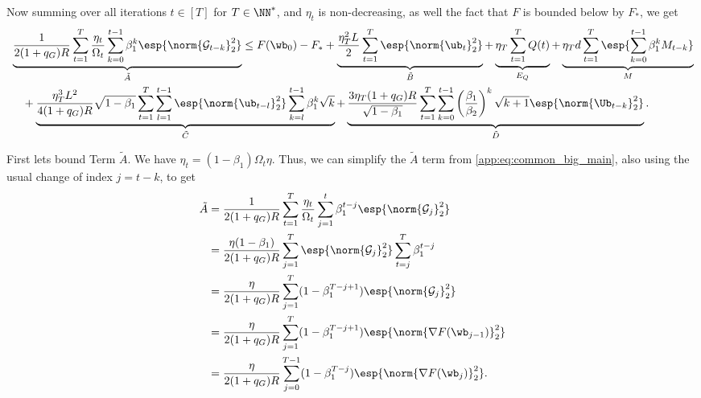 \documentclass[11pt, letterpaper]{article}
\begin{document}
Now summing over all iterations $t \in [T]$ for $T \in \NN^*$, and $\eta_t$ is non-decreasing, as well the fact that $F$ is bounded below by $F_*$, we get
\begin{align}
\nonumber
    &\underbrace{\frac{1}{2 (1+q_G)R} \sum_{t=1}^T \frac{\eta_t}{\Omega_t}\sum_{k=0}^{t-1} \beta_1^k \esp{\norm{\mathcal{G}_{t -k}}_2^2}}_{\tilde{A}} \leq
    F(\wb_0) - F_* + \underbrace{\frac{\eta_T^2 L}{2}\sum_{t=1}^T\esp{\norm{\ub_t}^2_2}}_{\tilde{B}}+\underbrace{\eta_T\sum_{t=1}^TQ(t)}_{E_Q}+ \underbrace{\eta_Td\sum_{t=1}^T\esp{\sum_{k=0}^{t-1}\beta_1^kM_{t-k}}}_{M}\\
    &\quad 
    +\underbrace{
    \frac{\eta_T^3 L^2}{4 (1+q_G)R}\sqrt{1-\beta_1}  \sum_{t=1}^T \sum_{l=1}^{t-1}
    \esp{\norm{\ub_{t-l}}^2_2}\sum_{k=l}^{t-1} \beta_1^k \sqrt{k}}_{\tilde{C}}
    + \underbrace{\frac{3 \eta_T (1+q_G)R}{\sqrt{1- \beta_1}} \sum_{t=1}^T \sum_{k=0}^{t-1}
    \left(\frac{\beta_1}{\beta_2}\right)^k \sqrt{k+1} \esp{\norm{\Ub_{t-k}}^2_2}}_{\tilde{D}}
    \label{app:eq:common_big_main}.
\end{align}

First lets bound Term $\tilde{A}$. We have $\eta_t = (1 - \beta_1) \Omega_t \eta$. Thus, we can simplify the $\tilde{A}$ term from \eqref{app:eq:common_big_main}, also using the usual change of index $j = t - k$, to get
\begin{align}
\nonumber
    \tilde{A} &= \frac{1}{2 (1+q_G)R} \sum_{t=1}^T \frac{\eta_t}{\Omega_t}\sum_{j=1}^{t} \beta_1^{t -j} \esp{\norm{\mathcal{G}_{j}}_2^2}\\
\nonumber
    &= \frac{\eta(1 - \beta_1)}{2 (1+q_G)R} \sum_{j=1}^T \esp{\norm{\mathcal{G}_{j}}_2^2} \sum_{t=j}^{T} \beta_1^{t - j} \\
\nonumber
    &= \frac{\eta}{2 (1+q_G)R} \sum_{j=1}^T (1 - \beta_1^{T - j + 1}) \esp{\norm{\mathcal{G}_{j}}_2^2}\\
\nonumber
    &= \frac{\eta}{2 (1+q_G)R} \sum_{j=1}^{T} (1 - \beta_1^{T - j +1}) \esp{\norm{\nabla F(\wb_{j-1})}_2^2}\\
    &= \frac{\eta}{2 (1+q_G)R} \sum_{j=0}^{T-1} (1 - \beta_1^{T - j}) \esp{\norm{\nabla F(\wb_{j})}_2^2}.
\end{align}
\end{document}
